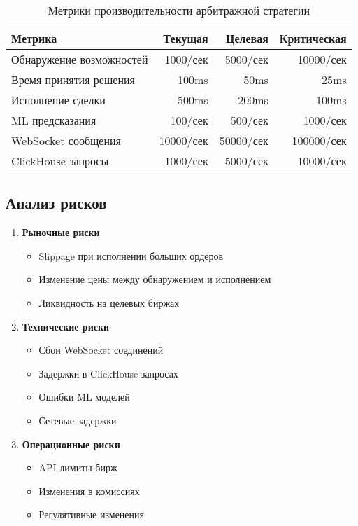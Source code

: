 \documentclass[a4paper,11pt]{article}
\begin{document}
\begin{table}[H]
\centering
\begin{tabularx}{\textwidth}{|X|r|r|r|}
\hline
\textbf{Метрика} & \textbf{Текущая} & \textbf{Целевая} & \textbf{Критическая} \\
\hline
Обнаружение возможностей & 1000/сек & 5000/сек & 10000/сек \\
Время принятия решения & 100ms & 50ms & 25ms \\
Исполнение сделки & 500ms & 200ms & 100ms \\
ML предсказания & 100/сек & 500/сек & 1000/сек \\
WebSocket сообщения & 10000/сек & 50000/сек & 100000/сек \\
ClickHouse запросы & 1000/сек & 5000/сек & 10000/сек \\
\hline
\end{tabularx}
\caption{Метрики производительности арбитражной стратегии}
\end{table}

\subsection{Анализ рисков}

\begin{enumerate}
    \item \textbf{Рыночные риски}
    \begin{itemize}
        \item Slippage при исполнении больших ордеров
        \item Изменение цены между обнаружением и исполнением
        \item Ликвидность на целевых биржах
    \end{itemize}
    
    \item \textbf{Технические риски}
    \begin{itemize}
        \item Сбои WebSocket соединений
        \item Задержки в ClickHouse запросах
        \item Ошибки ML моделей
        \item Сетевые задержки
    \end{itemize}
    
    \item \textbf{Операционные риски}
    \begin{itemize}
        \item API лимиты бирж
        \item Изменения в комиссиях
        \item Регулятивные изменения
    \end{itemize}
\end{enumerate}
\end{document}
